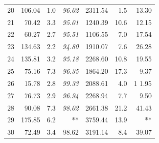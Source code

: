 \documentclass[11pt]{article}
\theoremstyle{plain}%
\theoremstyle{definition} \newtheorem{lem}{Lemma}[section]
\theoremstyle{definition} \newtheorem{claim}{Claim}[lem]
\theoremstyle{definition} \newtheorem{theorem}{Theorem}[section]
\theoremstyle{definition} \newtheorem{exo}{Exercice n$^\circ$}
\theoremstyle{definition} \newtheorem{quest}{}[exo]
\theoremstyle{definition} \newtheorem{sousquest}{}[quest]
\theoremstyle{remark}
\theoremstyle{definition}
\begin{document}
\begin{table}[H]
\begin{tabular}{|r|rrr|rrr|}
    20    & 106.04 & 1.0      & \it{ 96.02} & 2311.54 & 1.5       &  13.30 \\
    21    & 70.42 & 3.3     & \it{ 95.01} & 1240.39 & 10.6    &  12.15 \\
    22    & 60.27 & 2.7    & \it{ 95.51 }& 1106.55 & 7.0    &  17.54 \\
    23    & 134.63 & 2.2    & \it{ 94.80} & 1910.07 & 7.6      &  26.28 \\
    24    & 135.81 & 3.2      & \it{ 95.18} & 2268.60 & 10.8     &  19.55 \\
    25    & 75.16 & 7.3     & \it{ 96.35 }& 1864.20 & 17.3    &  9.37 \\
    26    & 15.78 & 2.8      &\it{  99.33} & 2088.61 & 4.0      & 1 1.95 \\
    27    & 76.73 & 2.9     & \it{ 96.94} & 2268.94 & 7.7      &  9.50 \\
    28    & 90.08 & 7.3      &\it{  98.02} & 2661.38 & 21.2     &  41.43 \\
    29    & 175.85 & 6.2     & **    & 3759.44 & 13.9    & ** \\
    30    & 72.49 & 3.4     &  98.62 & 3191.14 & 8.4      &  39.07 \\
    \bottomrule
    \end{tabular}%
  \label{tab:frac1}%
\end{table}%
\end{document}
